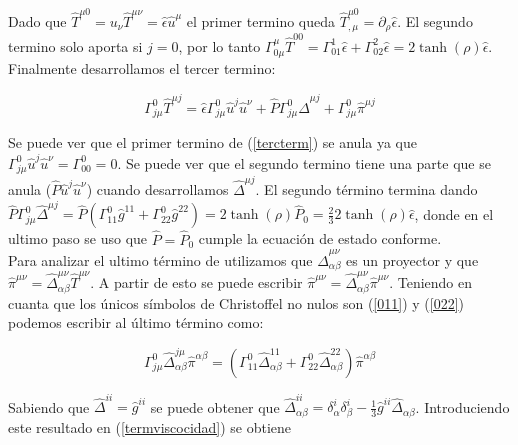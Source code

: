 \documentclass[11pt,a4paper]{article}
\begin{document}
Dado que $\hat{T}^{{\mu}{0}}=u_{\nu}\hat{T}^{{\mu}{\nu}}=\hat{\epsilon}\hat{u}^{\mu}$ el primer termino queda $\hat{T}^{{\mu}{0}}_{,\mu}={\partial}_{\rho}\hat{\epsilon}$. El segundo termino solo aporta si $j=0$, por lo tanto $\Gamma^{\mu}_{{0}{\mu}}\hat{T}^{{0}{0}}=\Gamma^{1}_{{0}{1}}\hat{\epsilon}+\Gamma^{2}_{{0}{2}}\hat{\epsilon}=2\tanh(\rho)\hat{\epsilon}$.
Finalmente desarrollamos el tercer termino:

\begin{equation}
\Gamma^{0}_{{j}{\mu}}\hat{T}^{{\mu}{j}}=\hat{\epsilon}\Gamma^{0}_{{j}{\mu}}\hat{u}^{j}\hat{u}^{\nu}+\hat{P}\Gamma^{0}_{{j}{\mu}}\hat{\Delta}^{{\mu}{j}}+\Gamma^{0}_{{j}{\mu}}\hat{\pi}^{{\mu}{j}}
\label{tercterm}
\end{equation}

Se puede ver que el primer termino de (\ref{tercterm}) se anula ya que $\Gamma^{0}_{{j}{\mu}}\hat{u}^{j}\hat{u}^{\nu}=\Gamma^{0}_{{0}{0}}=0$. Se puede ver que el segundo termino tiene una parte que se anula ($\hat{P}\hat{u}^{j}\hat{u}^{\nu}$) cuando desarrollamos $\hat{\Delta}^{{\mu}{j}}$. El segundo término termina dando $\hat{P}\Gamma^{0}_{{j}{\mu}}\hat{\Delta}^{{\mu}{j}}=\hat{P}(\Gamma^{0}_{{1}{1}}\hat{g}^{{1}{1}}+\Gamma^{0}_{{2}{2}}\hat{g}^{{2}{2}})=2\tanh(\rho)\hat{P}_{0}=\frac{2}{3}2\tanh(\rho)\hat{\epsilon}$, donde en el ultimo paso se uso que $\hat{P}=\hat{P}_{0}$ cumple la ecuación de estado conforme.\\


Para analizar el ultimo término de utilizamos que $\hat{\Delta}^{{\mu}{\nu}}_{{\alpha}{\beta}}$ es un proyector y que $\hat{\pi}^{{\mu}{\nu}}=\hat{\Delta}^{{\mu}{\nu}}_{{\alpha}{\beta}}\hat{T}^{{\mu}{\nu}}$. A partir de esto se puede escribir $\hat{\pi}^{{\mu}{\nu}}=\hat{\Delta}^{{\mu}{\nu}}_{{\alpha}{\beta}}\hat{\pi}^{{\mu}{\nu}}$. Teniendo en cuanta que los únicos símbolos de Christoffel no nulos son (\ref{011}) y (\ref{022}) podemos escribir al último término como:

\begin{equation}
\Gamma^{0}_{{j}{\mu}}\hat{\Delta}^{{j}{\mu}}_{{\alpha}{\beta}}\hat{\pi}^{{\alpha}{\beta}}=(\Gamma^{0}_{{1}{1}}\hat{\Delta}^{{1}{1}}_{{\alpha}{\beta}}+\Gamma^{0}_{{2}{2}}\hat{\Delta}^{{2}{2}}_{{\alpha}{\beta}})\hat{\pi}^{{\alpha}{\beta}}
\label{termviscocidad}
\end{equation}

Sabiendo que $\hat{\Delta}^{{i}{i}}=\hat{g}^{{i}{i}}$ se puede obtener que $\hat{\Delta}^{{i}{i}}_{{\alpha}{\beta}}={\delta}^{i}_{\alpha}{\delta}^{i}_{\beta}-\frac{1}{3}\hat{g}^{{i}{i}}\hat{\Delta}_{{\alpha}{\beta}}$. Introduciendo este resultado en (\ref{termviscocidad}) se obtiene 
\end{document}

